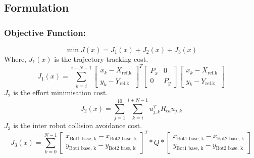 \documentclass[12pt,english]{report}
\begin{document}
\subsection{Formulation}
\subsubsection*{Objective Function:}
\begin{equation}
    \min J(x) = J_1(x) + J_2(x) + J_3(x)
\end{equation}
Where,  $J_1(x)$ is the trajectory tracking cost.
\begin{equation*}
    J_1(x) = \sum _{k=i} ^ {i+N-1} \begin{bmatrix}
        x_k - X_{\text{ref,k}} \\
        y_k - Y_{\text{ref,k}}
    \end{bmatrix}^T 
    \begin{bmatrix}
        P_x & 0 \\ 
        0 & P_y
    \end{bmatrix} \begin{bmatrix}
        x_k - X_{\text{ref,k}} \\
        y_k - Y_{\text{ref,k}}
    \end{bmatrix}
\end{equation*}
$J_2$ is the effort minimisation cost.
\begin{equation*}
    J_2(x) =\sum_{j=1}^{10} \sum_ {k=i}^ {i+N-1} u_{j,k}^T R_{ca} u_{j,k}
\end{equation*}
$J_3$ is the inter robot collision avoidance cost.
\begin{equation*}
    J_3(x) = \sum_{k=0}^{N-1}\begin{bmatrix}
        x_{\text{Bot1 base, k}} - x_{\text{Bot2 base, k}} \\
        y_{\text{Bot1 base, k}} - y_{\text{Bot2 base, k}}
    \end{bmatrix}^T * Q * \begin{bmatrix}
        x_{\text{Bot1 base, k}} - x_{\text{Bot2 base, k}} \\
        y_{\text{Bot1 base, k}} - y_{\text{Bot2 base, k}}
    \end{bmatrix}
\end{equation*}
\end{document}
